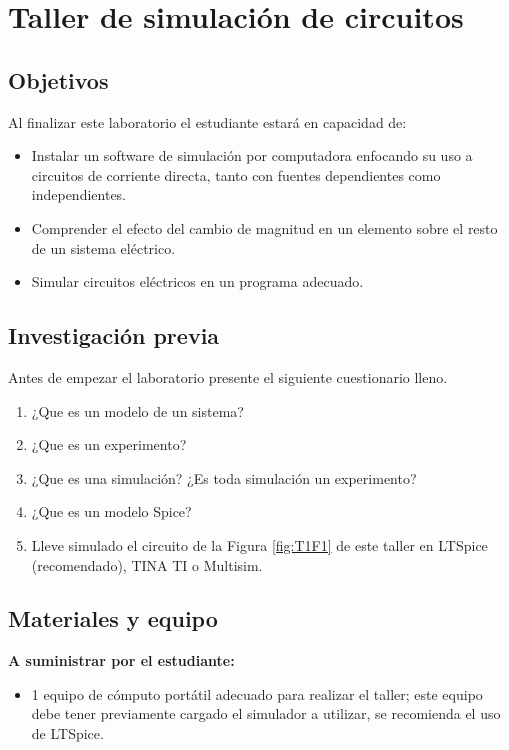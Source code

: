 \documentclass[12pt,letterpaper]{report}
\newcommand{\obj}{Objetivos}
\newcommand{\inv}{Investigación previa}
\newcommand{\mat}{Materiales y equipo}
\newcommand{\capacidad}{Al finalizar este laboratorio el estudiante estará en capacidad de:}
\newcommand{\antesde}{Antes de empezar el laboratorio presente el siguiente cuestionario lleno.}
\begin{document}
\chapter{Taller de simulación de circuitos}
\section{\obj}
\capacidad
\begin{itemize}
\item	Instalar un software de simulación por computadora enfocando su uso a circuitos de corriente directa, tanto con fuentes dependientes como independientes.
\item	Comprender el efecto del cambio de magnitud en un elemento sobre el resto de un sistema eléctrico.
\item	Simular circuitos eléctricos en un programa adecuado.
\end{itemize}
\section{\inv}
\antesde
\begin{enumerate}
\item ¿Que es un modelo de un sistema? 
\item ¿Que es un experimento? 
\item ¿Que es una simulación? ¿Es toda simulación un experimento? 
\item ¿Que es un modelo Spice? 
\item Lleve simulado el circuito de la Figura \ref{fig:T1F1} de este taller en LTSpice (recomendado), TINA TI o Multisim.
\end{enumerate}
\section{\mat}
\textbf{A suministrar por el estudiante:}
\begin{itemize}
\item 1 equipo de cómputo portátil adecuado para realizar el taller; este equipo debe tener previamente cargado el simulador a utilizar, se recomienda el uso de LTSpice. 
\end{itemize}
\end{document}
